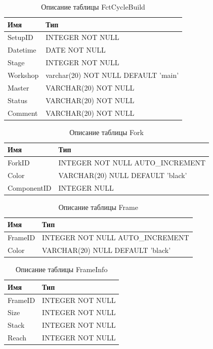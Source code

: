 \begin{table}[h!] 
	\centering
	\caption{Описание таблицы FctCycleBuild}
	\small
	\begin{tabular}{|l|l|}
		\hline \textbf{Имя} & \textbf{Тип} \\
		\hline
		SetupID &       INTEGER NOT NULL \\ \hline
		Datetime &      DATE NOT NULL \\ \hline
		Stage & INTEGER NOT NULL \\ \hline
		Workshop &      varchar(20) NOT NULL DEFAULT 'main' \\ \hline
		Master &        VARCHAR(20) NOT NULL \\ \hline
		Status &        VARCHAR(20) NOT NULL \\ \hline
		Comment &       VARCHAR(20) NOT NULL \\ \hline
	\end{tabular}
	\label{}
\end{table}


\begin{table}[h!] 
	\centering
	\caption{Описание таблицы Fork}
	\begin{tabular}{|l|l|}
		\hline \textbf{Имя} & \textbf{Тип} \\
		\hline
		ForkID &  INTEGER NOT NULL AUTO\_INCREMENT \\ \hline
		Color & VARCHAR(20) NULL DEFAULT 'black' \\ \hline
		ComponentID &  INTEGER NULL \\ \hline
	\end{tabular}
	\label{ta:fork}
\end{table}



\begin{table}[h!] 
	\centering
	\caption{Описание таблицы Frame}
	\begin{tabular}{|l|l|}
		\hline \textbf{Имя} & \textbf{Тип} \\
		\hline
		FrameID &  INTEGER NOT NULL AUTO\_INCREMENT \\ \hline
		Color & VARCHAR(20) NULL DEFAULT 'black' \\ \hline
	\end{tabular}
	\label{tab:frame}
\end{table}



\begin{table}[h!] 
	\centering
	\caption{Описание таблицы FrameInfo}
	\begin{tabular}{|l|l|}
		\hline \textbf{Имя} & \textbf{Тип} \\
		\hline
		FrameID &       INTEGER NOT NULL \\ \hline
		Size & INTEGER NOT NULL \\ \hline
		Stack & INTEGER NOT NULL \\ \hline
		Reach & INTEGER NOT NULL \\ \hline
	\end{tabular}
	\label{tab:frameinfo}
\end{table}


